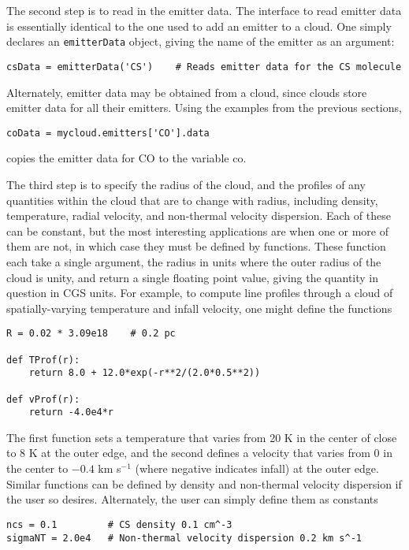 \documentclass[12pt]{article}
\begin{document}
The second step is to read in the emitter data. The interface to read emitter data is essentially identical to the one used to add an emitter to a cloud. One simply declares an \verb=emitterData= object, giving the name of the emitter as an argument:
\begin{verbatim}
csData = emitterData('CS')    # Reads emitter data for the CS molecule
\end{verbatim}
Alternately, emitter data may be obtained from a cloud, since clouds store emitter data for all their emitters. Using the examples from the previous sections,
\begin{verbatim}
coData = mycloud.emitters['CO'].data
\end{verbatim}
copies the emitter data for CO to the variable co.

The third step is to specify the radius of the cloud, and the profiles of any quantities within the cloud that are to change with radius, including density, temperature, radial velocity, and non-thermal velocity dispersion. Each of these can be constant, but the most interesting applications are when one or more of them are not, in which case they must be defined by functions. These function each take a single argument, the radius in units where the outer radius of the cloud is unity, and return a single floating point value, giving the quantity in question in CGS units. For example, to compute line profiles through a cloud of spatially-varying temperature and infall velocity, one might define the functions
\begin{verbatim}
R = 0.02 * 3.09e18    # 0.2 pc

def TProf(r):
    return 8.0 + 12.0*exp(-r**2/(2.0*0.5**2))

def vProf(r):
    return -4.0e4*r
\end{verbatim}
The first function sets a temperature that varies from 20 K in the center of close to 8 K at the outer edge, and the second defines a velocity that varies from 0 in the center to $-0.4$ km s$^{-1}$ (where negative indicates infall) at the outer edge. Similar functions can be defined by density and non-thermal velocity dispersion if the user so desires. Alternately, the user can simply define them as constants
\begin{verbatim}
ncs = 0.1         # CS density 0.1 cm^-3
sigmaNT = 2.0e4   # Non-thermal velocity dispersion 0.2 km s^-1
\end{verbatim}
\end{document}
